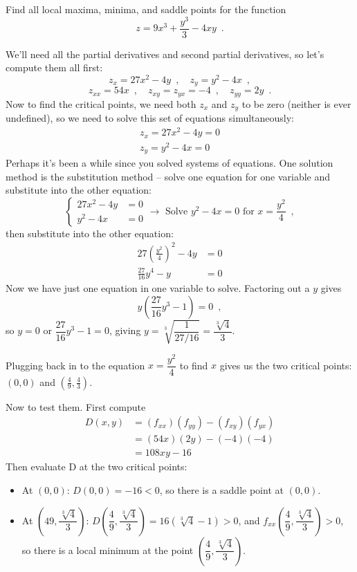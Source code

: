 \begin{example}
Find all local maxima, minima, and saddle points for the function
$$z=9x^3 + \frac{y^3}{3}-4xy \enspace .$$

\begin{solution}
  We'll need all the partial derivatives and second partial derivatives, so let's compute them all first:
$$z_x = 27x^2-4y \enspace ,\quad z_y = y^2-4x \enspace, $$
$$z_{xx} = 54x \enspace , \quad z_{xy} = z_{yx} = -4 \enspace , \quad z_{yy} = 2y \enspace.$$
Now to find the critical points, we need both $z_x$ and $z_y$ to be zero (neither is ever undefined), so we need to solve this set of equations simultaneously:
\begin{align*}
z_x = 27x^2 - 4y = 0 \\
z_y =   y^2 - 4x = 0
\end{align*}
Perhaps it's been a while since you solved systems of equations. One solution method is the substitution method -- solve one equation for one variable and substitute into the other equation:
$$\begin{cases}
27x^2 - 4y &= 0 \\
y^2 - 4x &= 0
\end{cases} \rightarrow \mbox{ Solve } y^2 - 4x = 0 \mbox{ for } x = \frac{y^2}{4} \enspace ,$$
then substitute into the other equation:
\begin{align*}
27\left(\frac{y^2}{4}\right)^2 - 4y &= 0\\
\frac{27}{16}y^4 - y &= 0
\end{align*}
Now we have just one equation in one variable to solve. Factoring out a $y$ gives
$$y\left(\frac{27}{16}y^3-1\right) = 0 \enspace ,$$
so $y=0$ or $\dfrac{27}{16}y^3-1=0$, giving $y=\sqrt[3]{\dfrac{1}{27/16}} = \dfrac{\sqrt[3]{4}}{3}$.

Plugging back in to the equation $x = \dfrac{y^2}{4}$ to find $x$ gives us the two critical points: $(0,0)$ and $\left(\frac{4}{9}, \frac{4}{3}\right)$.

Now to test them. First compute
\begin{align*}
D(x,y) &= (f_{xx})(f_{yy})-(f_{xy})(f_{yx}) \\
  &= (54x)(2y)-(-4)(-4) \\
  &= 108xy-16
\end{align*}
Then evaluate D at the two critical points:
  \begin{itemize}
    \item At $(0,0)$: $D(0,0)=-16 < 0$, so there is a saddle point at $(0, 0)$.
    \item At $\left(49, \dfrac{\sqrt[3]{4}}{3}\right)$: $D\left(\dfrac{4}{9}, \dfrac{\sqrt[3]{4}}{3}\right) = 16\left(\sqrt[3]{4} - 1\right) > 0$, and $f_{xx}\left(\dfrac{4}{9}, \dfrac{\sqrt[3]{4}}{3}\right) > 0$, so there is a local minimum at the point $\left(\dfrac{4}{9}, \dfrac{\sqrt[3]{4}}{3}\right)$.
  \end{itemize}
\end{solution}\end{example}

